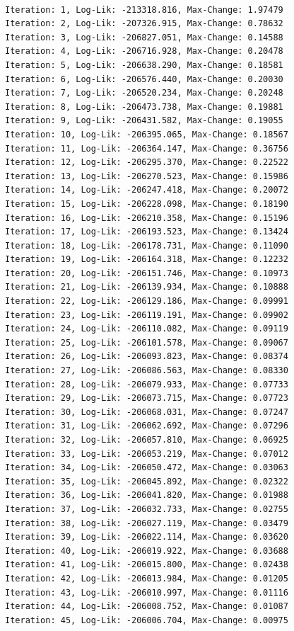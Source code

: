 \documentclass[
  letterpaper,
  DIV=11,
  numbers=noendperiod]{scrreport}
\begin{document}
\begin{verbatim}

Iteration: 1, Log-Lik: -213318.816, Max-Change: 1.97479
Iteration: 2, Log-Lik: -207326.915, Max-Change: 0.78632
Iteration: 3, Log-Lik: -206827.051, Max-Change: 0.14588
Iteration: 4, Log-Lik: -206716.928, Max-Change: 0.20478
Iteration: 5, Log-Lik: -206638.290, Max-Change: 0.18581
Iteration: 6, Log-Lik: -206576.440, Max-Change: 0.20030
Iteration: 7, Log-Lik: -206520.234, Max-Change: 0.20248
Iteration: 8, Log-Lik: -206473.738, Max-Change: 0.19881
Iteration: 9, Log-Lik: -206431.582, Max-Change: 0.19055
Iteration: 10, Log-Lik: -206395.065, Max-Change: 0.18567
Iteration: 11, Log-Lik: -206364.147, Max-Change: 0.36756
Iteration: 12, Log-Lik: -206295.370, Max-Change: 0.22522
Iteration: 13, Log-Lik: -206270.523, Max-Change: 0.15986
Iteration: 14, Log-Lik: -206247.418, Max-Change: 0.20072
Iteration: 15, Log-Lik: -206228.098, Max-Change: 0.18190
Iteration: 16, Log-Lik: -206210.358, Max-Change: 0.15196
Iteration: 17, Log-Lik: -206193.523, Max-Change: 0.13424
Iteration: 18, Log-Lik: -206178.731, Max-Change: 0.11090
Iteration: 19, Log-Lik: -206164.318, Max-Change: 0.12232
Iteration: 20, Log-Lik: -206151.746, Max-Change: 0.10973
Iteration: 21, Log-Lik: -206139.934, Max-Change: 0.10888
Iteration: 22, Log-Lik: -206129.186, Max-Change: 0.09991
Iteration: 23, Log-Lik: -206119.191, Max-Change: 0.09902
Iteration: 24, Log-Lik: -206110.082, Max-Change: 0.09119
Iteration: 25, Log-Lik: -206101.578, Max-Change: 0.09067
Iteration: 26, Log-Lik: -206093.823, Max-Change: 0.08374
Iteration: 27, Log-Lik: -206086.563, Max-Change: 0.08330
Iteration: 28, Log-Lik: -206079.933, Max-Change: 0.07733
Iteration: 29, Log-Lik: -206073.715, Max-Change: 0.07723
Iteration: 30, Log-Lik: -206068.031, Max-Change: 0.07247
Iteration: 31, Log-Lik: -206062.692, Max-Change: 0.07296
Iteration: 32, Log-Lik: -206057.810, Max-Change: 0.06925
Iteration: 33, Log-Lik: -206053.219, Max-Change: 0.07012
Iteration: 34, Log-Lik: -206050.472, Max-Change: 0.03063
Iteration: 35, Log-Lik: -206045.892, Max-Change: 0.02322
Iteration: 36, Log-Lik: -206041.820, Max-Change: 0.01988
Iteration: 37, Log-Lik: -206032.733, Max-Change: 0.02755
Iteration: 38, Log-Lik: -206027.119, Max-Change: 0.03479
Iteration: 39, Log-Lik: -206022.114, Max-Change: 0.03620
Iteration: 40, Log-Lik: -206019.922, Max-Change: 0.03688
Iteration: 41, Log-Lik: -206015.800, Max-Change: 0.02438
Iteration: 42, Log-Lik: -206013.984, Max-Change: 0.01205
Iteration: 43, Log-Lik: -206010.997, Max-Change: 0.01116
Iteration: 44, Log-Lik: -206008.752, Max-Change: 0.01087
Iteration: 45, Log-Lik: -206006.704, Max-Change: 0.00975

\end{verbatim}
\end{document}
